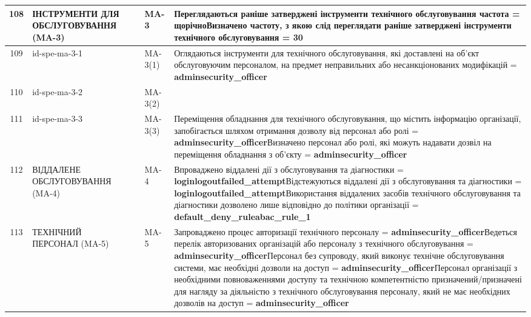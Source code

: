 \documentclass[10pt]{article}
\begin{document}
\begin{longtable}{|c|>{\raggedright\arraybackslash}p{2.5cm}|>{\raggedright\arraybackslash}p{4.5cm}|>{\raggedright\arraybackslash}p{3cm}|>{\raggedright\arraybackslash}p{4.5cm}|}
108 & ІНСТРУМЕНТИ ДЛЯ ОБСЛУГОВУВАННЯ (MA-3) &  & MA-3 & Переглядаються раніше затверджені інструменти технічного обслуговування частота = \textbf{щорічно}\newline Визначено частоту, з якою слід переглядати раніше затверджені інструменти технічного обслуговування = \textbf{30} \\ \hline
109 & id-spe-ma-3-1 &  & MA-3(1) & Оглядаються інструменти для технічного обслуговування, які доставлені на об'єкт обслуговуючим персоналом, на предмет неправильних або несанкціонованих модифікацій = \textbf{adminsecurity\_\allowbreak{}officer} \\ \hline
110 & id-spe-ma-3-2 &  & MA-3(2) &  \\ \hline
111 & id-spe-ma-3-3 &  & MA-3(3) & Переміщення обладнання для технічного обслуговування, що містить інформацію організації, запобігається шляхом отримання дозволу від персонал або ролі = \textbf{adminsecurity\_\allowbreak{}officer}\newline Визначено персонал або ролі, які можуть надавати дозвіл на переміщення обладнання з об'єкту = \textbf{adminsecurity\_\allowbreak{}officer} \\ \hline
112 & ВІДДАЛЕНЕ ОБСЛУГОВУВАННЯ (MA-4) &  & MA-4 & Впроваджено віддалені дії з обслуговування та діагностики = \textbf{loginlogoutfailed\_\allowbreak{}attempt}\newline Відстежуються віддалені дії з обслуговування та діагностики = \textbf{loginlogoutfailed\_\allowbreak{}attempt}\newline Використання віддалених засобів технічного обслуговування та діагностики дозволено лише відповідно до політики організації = \textbf{default\_\allowbreak{}deny\_\allowbreak{}ruleabac\_\allowbreak{}rule\_\allowbreak{}1} \\ \hline
113 & ТЕХНІЧНИЙ ПЕРСОНАЛ (MA-5) &  & MA-5 & Запроваджено процес авторизації технічного персоналу = \textbf{adminsecurity\_\allowbreak{}officer}\newline Ведеться перелік авторизованих організацій або персоналу з технічного обслуговування = \textbf{adminsecurity\_\allowbreak{}officer}\newline Персонал без супроводу, який виконує технічне обслуговування системи, має необхідні дозволи на доступ = \textbf{adminsecurity\_\allowbreak{}officer}\newline Персонал організації з необхідними повноваженнями доступу та технічною компетентністю призначений/призначені для нагляду за діяльністю з технічного обслуговування персоналу, який не має необхідних дозволів на доступ = \textbf{adminsecurity\_\allowbreak{}officer} \\ \hline

\end{longtable}
\end{document}
